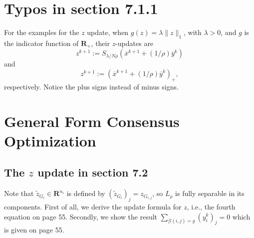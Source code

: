 \documentclass{article}
\theoremstyle{remark}
\def\R{\mathbf{R}}
\begin{document}
\section{Typos in section 7.1.1}
For the examples for the $z$ update, when $g(z)=\lambda\|z\|_1$, with $\lambda>0$, and $g$ is the indicator function of $\R_+$, their $z$-updates are
\[
z^{k+1}:=S_{\lambda/N\rho}(\overline{x}^{k+1}+(1/\rho)\overline{y}^{k})
\]
and
\[
z^{k+1}:=(\overline{x}^{k+1}+(1/\rho)\overline{y}^{k})_+,
\]
respectively. Notice the plus signs instead of minus signs.

\section{General Form Consensus Optimization}
\subsection{The $z$ update in section 7.2}
Note that $\tilde{z}_{G_i}\in\R^{n_i}$ is defined by $(\tilde{z}_{G_i})_j=z_{G_{i,j}}$, so $L_{\rho}$ is fully separable in its components. First of all, we derive the update formula for $z$, i.e., the fourth equation on page 55. Secondly, we show the result
\(
\sum_{\mathcal{G}(i,j)=g}(y_i^k)_j=0
\)
which is given on page 55.
\end{document}
